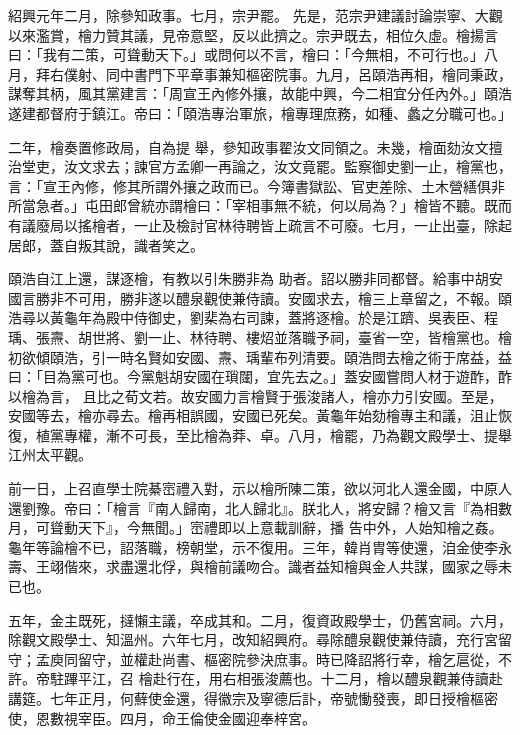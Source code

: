 \begin{pinyinscope}
 紹興元年二月，除參知政事。七月，宗尹罷。
 先是，范宗尹建議討論崇寧、大觀以來濫賞，檜力贊其議，見帝意堅，反以此擠之。宗尹既去，相位久虛。檜揚言曰：「我有二策，可聳動天下。」或問何以不言，檜曰：「今無相，不可行也。」八月，拜右僕射、同中書門下平章事兼知樞密院事。九月，呂頤浩再相，檜同秉政，謀奪其柄，風其黨建言：「周宣王內修外攘，故能中興，今二相宜分任內外。」頤浩遂建都督府于鎮江。帝曰：「頤浩專治軍旅，檜專理庶務，如種、蠡之分職可也。」



 二年，檜奏置修政局，自為提
 舉，參知政事翟汝文同領之。未幾，檜面劾汝文擅治堂吏，汝文求去；諫官方孟卿一再論之，汝文竟罷。監察御史劉一止，檜黨也，言：「宣王內修，修其所謂外攘之政而已。今簿書獄訟、官吏差除、土木營繕俱非所當急者。」屯田郎曾統亦謂檜曰：「宰相事無不統，何以局為？」檜皆不聽。既而有議廢局以搖檜者，一止及檢討官林待聘皆上疏言不可廢。七月，一止出臺，除起居郎，蓋自叛其說，識者笑之。



 頤浩自江上還，謀逐檜，有教以引朱勝非為
 助者。詔以勝非同都督。給事中胡安國言勝非不可用，勝非遂以醴泉觀使兼侍讀。安國求去，檜三上章留之，不報。頤浩尋以黃龜年為殿中侍御史，劉棐為右司諫，蓋將逐檜。於是江躋、吳表臣、程瑀、張燾、胡世將、劉一止、林待聘、樓炤並落職予祠，臺省一空，皆檜黨也。檜初欲傾頤浩，引一時名賢如安國、燾、瑀輩布列清要。頤浩問去檜之術于席益，益曰：「目為黨可也。今黨魁胡安國在瑣闥，宜先去之。」蓋安國嘗問人材于遊酢，酢以檜為言，
 且比之荀文若。故安國力言檜賢于張浚諸人，檜亦力引安國。至是，安國等去，檜亦尋去。檜再相誤國，安國已死矣。黃龜年始劾檜專主和議，沮止恢復，植黨專權，漸不可長，至比檜為莽、卓。八月，檜罷，乃為觀文殿學士、提舉江州太平觀。



 前一日，上召直學士院綦崈禮入對，示以檜所陳二策，欲以河北人還金國，中原人還劉豫。帝曰：「檜言『南人歸南，北人歸北』。朕北人，將安歸？檜又言『為相數月，可聳動天下』，今無聞。」崈禮即以上意載訓辭，播
 告中外，人始知檜之姦。龜年等論檜不已，詔落職，榜朝堂，示不復用。三年，韓肖胄等使還，洎金使李永壽、王翊偕來，求盡還北俘，與檜前議吻合。識者益知檜與金人共謀，國家之辱未已也。



 五年，金主既死，撻懶主議，卒成其和。二月，復資政殿學士，仍舊宮祠。六月，除觀文殿學士、知溫州。六年七月，改知紹興府。尋除醴泉觀使兼侍讀，充行宮留守；孟庾同留守，並權赴尚書、樞密院參決庶事。時已降詔將行幸，檜乞扈從，不許。帝駐蹕平江，召
 檜赴行在，用右相張浚薦也。十二月，檜以醴泉觀兼侍讀赴講筵。七年正月，何蘚使金還，得徽宗及寧德后訃，帝號慟發喪，即日授檜樞密使，恩數視宰臣。四月，命王倫使金國迎奉梓宮。




\end{pinyinscope}
